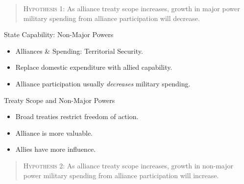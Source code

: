 \documentclass{beamer}
\begin{document}

\begin{frame}[standout]


\begin{quote}
\textsc{Hypothesis 1}: As alliance treaty scope increases, growth in major power military spending from alliance participation will decrease. 
\end{quote}

\end{frame} 


\begin{frame}{State Capability: Non-Major Powers}

\begin{itemize}
\item Alliances \& Spending: Territorial Security.
\pause
\item Replace domestic expenditure with allied capability.
\pause
\item Alliance participation usually \emph{decreases} military spending. 
\end{itemize} 

\end{frame}


\begin{frame}{Treaty Scope and Non-Major Powers}

\begin{itemize}
\item Broad treaties restrict freedom of action.
\pause 
\item Alliance is more valuable.
\pause
\item Allies have more influence.
\end{itemize} 

\end{frame}


\begin{frame}[standout]

\begin{quote}
\textsc{Hypothesis 2}: As alliance treaty scope increases, growth in non-major power military spending from alliance participation will increase. 
\end{quote} 


\end{frame}
\end{document}
